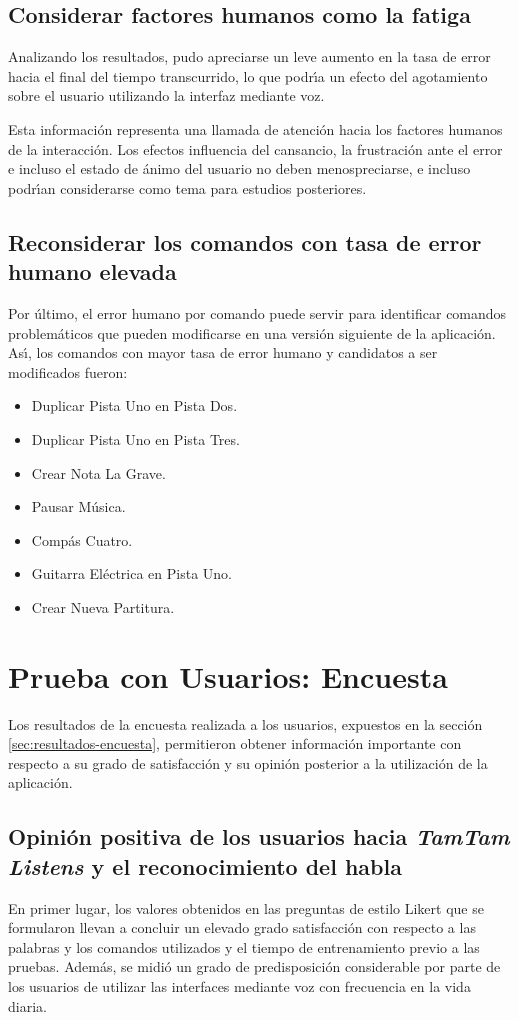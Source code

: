 \subsection{Considerar factores humanos como la fatiga}
Analizando los resultados, pudo apreciarse un leve aumento en la tasa de error hacia el final del tiempo
transcurrido, lo que podr{{\'\i}}a un efecto del agotamiento sobre el usuario utilizando la
interfaz mediante voz.

Esta informaci\'on representa una llamada de atenci\'on hacia los factores humanos de la interacci\'on.
Los efectos influencia del cansancio, la frustraci\'on ante el error e incluso el estado de \'animo
del usuario no deben menospreciarse, e incluso podr{\'\i}an considerarse como tema para estudios
posteriores.

\subsection{Reconsiderar los comandos con tasa de error humano elevada}
Por \'ultimo, el error humano por comando puede servir para identificar comandos 
problem\'aticos que pueden modificarse en una versi\'on siguiente de la aplicaci\'on.
As{{\'\i}}, los comandos con mayor tasa de error humano y candidatos a ser modificados fueron:

\begin{itemize}
	\item Duplicar Pista Uno en Pista Dos.
	\item Duplicar Pista Uno en Pista Tres.
	\item Crear Nota La Grave.
	\item Pausar M\'usica.
	\item Comp\'as Cuatro.
	\item Guitarra El\'ectrica en Pista Uno.
	\item Crear Nueva Partitura.
\end{itemize}

\section{Prueba con Usuarios: Encuesta}
Los resultados de la encuesta realizada a los usuarios, expuestos en la secci\'on \ref{sec:resultados-encuesta},
permitieron obtener informaci\'on importante con respecto a su grado de satisfacci\'on y su opini\'on 
posterior a la utilizaci\'on de la aplicaci\'on.

\subsection[Opini\'on positiva de los usuarios hacia \emph{TamTam Listens} y el \\ reconocimiento del habla]
{Opini\'on positiva de los usuarios hacia \emph{TamTam Listens} y el reconocimiento del habla}
En primer lugar, los valores obtenidos en las preguntas de estilo Likert que se formularon
llevan a concluir un elevado grado satisfacci\'on con respecto a las palabras y los comandos
utilizados y el tiempo de entrenamiento previo a las pruebas.
Adem\'as, se midi\'o un grado de predisposici\'on considerable por parte de los usuarios de utilizar
las interfaces mediante voz con frecuencia en la vida diaria.

